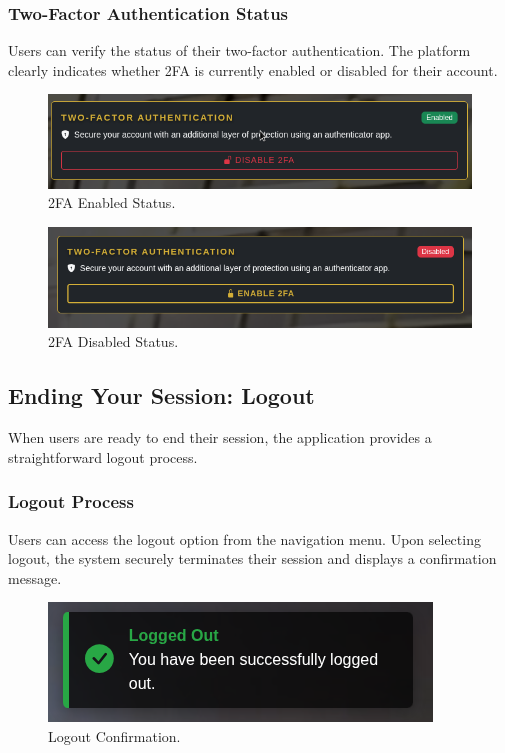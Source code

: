 \subsubsection{Two-Factor Authentication Status} Users can verify the status of their two-factor authentication. The platform clearly indicates whether 2FA is currently enabled or disabled for their account.

\begin{figure}[H]
    \centering
    \includegraphics[width=0.65\linewidth]{Figures/images/new_images/2FAEnabled.png}
    \caption{2FA Enabled Status.} %
    \label{fig:2fa-enabled-journey}
\end{figure}

\begin{figure}[H]
    \centering
    \includegraphics[width=0.65\linewidth]{Figures/images/new_images/2FADisabled.png}
    \caption{2FA Disabled Status.} %
    \label{fig:2fa-disabled-journey}
\end{figure}

\subsection{Ending Your Session: Logout}

When users are ready to end their session, the application provides a straightforward logout process.

\subsubsection{Logout Process} Users can access the logout option from the navigation menu. Upon selecting logout, the system securely terminates their session and displays a confirmation message.

\begin{figure}[H]
    \centering
    \includegraphics[width=0.65\linewidth]{Figures/images/new_images/LogoutSuccessfully.png}
    \caption{Logout Confirmation.} %
    \label{fig:logout-confirmation-journey}
\end{figure}

